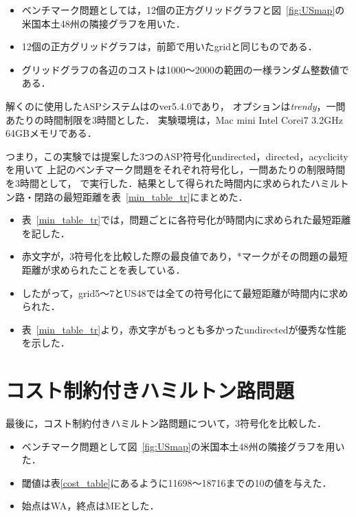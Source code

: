 \begin{itemize}
\item ベンチマーク問題としては，12個の正方グリッドグラフと図~\ref{fig:USmap}の米国本土48州の隣接グラフを用いた．
\item 12個の正方グリッドグラフは，前節で用いたgridと同じものである．
\item グリッドグラフの各辺のコストは1000〜2000の範囲の一様ランダム整数値である．
\end{itemize}

解くのに使用したASPシステムは{\clingo}のver5.4.0であり，
オプションは\textit{trendy}，一問あたりの時間制限を3時間とした．
実験環境は，Mac mini Intel Corei7 3.2GHz 64GBメモリである．

つまり，この実験では提案した3つのASP符号化\textsf{undirected}，\textsf{directed}，\textsf{acyclicity}を用いて
上記のベンチマーク問題をそれぞれ符号化し，一問あたりの制限時間を3時間として，
{\clingo}で実行した．結果として得られた時間内に求められたハミルトン路・閉路の最短距離を表~\ref{min_table_tr}にまとめた．

\begin{itemize}
\item 表~\ref{min_table_tr}では，問題ごとに各符号化が時間内に求められた最短距離を記した．
\item 赤文字が，3符号化を比較した際の最良値であり，*マークがその問題の最短距離が求められたことを表している．
\item したがって，grid5〜7とUS48では全ての符号化にて最短距離が時間内に求められた．
\item 表~\ref{min_table_tr}より，赤文字がもっとも多かった\textsf{undirected}が優秀な性能を示した．
\end{itemize}

\section{コスト制約付きハミルトン路問題}


最後に，コスト制約付きハミルトン路問題について，3符号化を比較した．

\begin{itemize}
\item ベンチマーク問題として図~\ref{fig:USmap}の米国本土48州の隣接グラフを用いた．
\item 閾値は表\ref{cost_table}にあるように11698〜18716までの10の値を与えた．
\item 始点はWA，終点はMEとした．
\end{itemize}

